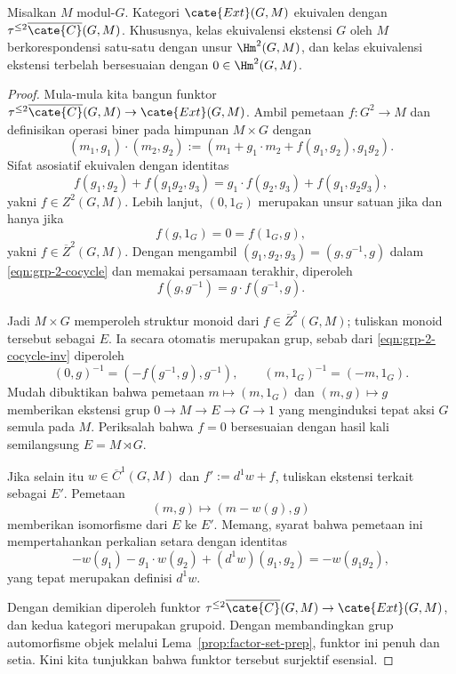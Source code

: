 \begin{theorem}\label{prop:factor-set}
	Misalkan $M$ modul-$G$. Kategori $\cate{Ext}(G,M)$ ekuivalen dengan
	$\tau^{\leq2}\overline{\cate{C}}(G,M)$. Khususnya, kelas ekuivalensi
	ekstensi $G$ oleh $M$ berkorespondensi satu-satu dengan unsur
	$\Hm^2(G,M)$, dan kelas ekuivalensi ekstensi terbelah bersesuaian dengan
	$0\in\Hm^2(G,M)$.
\end{theorem}
\begin{proof}
	Mula-mula kita bangun funktor
	$\tau^{\leq2}\overline{\cate{C}}(G,M)\to\cate{Ext}(G,M)$. Ambil
	pemetaan $f:G^2\to M$ dan definisikan operasi biner pada himpunan $M\times G$
	dengan
	\[ (m_1,g_1)\cdot(m_2,g_2):=
	\left(m_1+g_1\cdot m_2+f(g_1,g_2),g_1g_2\right). \]
	Sifat asosiatif ekuivalen dengan identitas
	\begin{equation}\label{eqn:grp-2-cocycle}
		f(g_1,g_2)+f(g_1g_2,g_3)
		=g_1\cdot f(g_2,g_3)+f(g_1,g_2g_3),
	\end{equation}
	yakni $f\in Z^2(G,M)$. Lebih lanjut, $(0,1_G)$ merupakan unsur satuan jika
	dan hanya jika
	\[ f(g,1_G)=0=f(1_G,g), \]
	yakni $f\in\overline{Z}^2(G,M)$. Dengan mengambil
	$(g_1,g_2,g_3)=(g,g^{-1},g)$ dalam \eqref{eqn:grp-2-cocycle} dan memakai
	persamaan terakhir, diperoleh
	\begin{equation}\label{eqn:grp-2-cocycle-inv}
		f(g,g^{-1})=g\cdot f(g^{-1},g).
	\end{equation}

	Jadi $M\times G$ memperoleh struktur monoid dari
	$f\in\overline{Z}^2(G,M)$; tuliskan monoid tersebut sebagai $E$. Ia secara
	otomatis merupakan grup, sebab dari \eqref{eqn:grp-2-cocycle-inv} diperoleh
	\[ (0,g)^{-1}=\left(-f(g^{-1},g),g^{-1}\right),\qquad
	(m,1_G)^{-1}=(-m,1_G). \]
	Mudah dibuktikan bahwa pemetaan $m\mapsto(m,1_G)$ dan $(m,g)\mapsto g$
	memberikan ekstensi grup $0\to M\to E\to G\to1$ yang menginduksi tepat
	aksi $G$ semula pada $M$. Periksalah bahwa $f=0$ bersesuaian dengan
	hasil kali semilangsung $E=M\rtimes G$.

	Jika selain itu $w\in\overline{C}^1(G,M)$ dan $f':=d^1w+f$, tuliskan
	ekstensi terkait sebagai $E'$. Pemetaan
	\[ (m,g)\mapsto(m-w(g),g) \]
	memberikan isomorfisme dari $E$ ke $E'$. Memang, syarat bahwa pemetaan ini
	mempertahankan perkalian setara dengan identitas
	\[ -w(g_1)-g_1\cdot w(g_2)+(d^1w)(g_1,g_2)=-w(g_1g_2), \]
	yang tepat merupakan definisi $d^1w$.

	Dengan demikian diperoleh funktor
	$\tau^{\leq2}\overline{\cate{C}}(G,M)\to\cate{Ext}(G,M)$, dan kedua
	kategori merupakan grupoid. Dengan membandingkan grup automorfisme objek
	melalui Lema~\ref{prop:factor-set-prep}, funktor ini penuh dan setia. Kini
	kita tunjukkan bahwa funktor tersebut surjektif esensial.


\end{proof}
